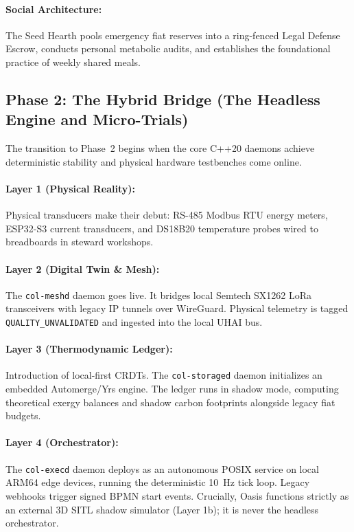 \paragraph{Social Architecture:} The Seed Hearth pools emergency fiat reserves into a ring-fenced Legal Defense Escrow, conducts personal metabolic audits, and establishes the foundational practice of weekly shared meals.

\subsection{Phase 2: The Hybrid Bridge (The Headless Engine and Micro-Trials)}
\label{subsec:phase2_hybrid}

The transition to Phase~2 begins when the core C++20 daemons achieve deterministic stability and physical hardware testbenches come online.

\paragraph{Layer 1 (Physical Reality):} Physical transducers make their debut: RS-485 Modbus RTU energy meters, ESP32-S3 current transducers, and DS18B20 temperature probes wired to breadboards in steward workshops.
\paragraph{Layer 2 (Digital Twin \& Mesh):} The \texttt{col-meshd} daemon goes live. It bridges local Semtech SX1262 LoRa transceivers with legacy IP tunnels over WireGuard. Physical telemetry is tagged \texttt{QUALITY\_UNVALIDATED} and ingested into the local UHAI bus.
\paragraph{Layer 3 (Thermodynamic Ledger):} Introduction of local-first CRDTs. The \texttt{col-storaged} daemon initializes an embedded Automerge/Yrs engine. The ledger runs in shadow mode, computing theoretical exergy balances and shadow carbon footprints alongside legacy fiat budgets.
\paragraph{Layer 4 (Orchestrator):} The \texttt{col-execd} daemon deploys as an autonomous POSIX service on local ARM64 edge devices, running the deterministic 10~Hz tick loop. Legacy webhooks trigger signed BPMN start events. Crucially, Oasis functions strictly as an external 3D SITL shadow simulator (Layer 1b); it is never the headless orchestrator.
